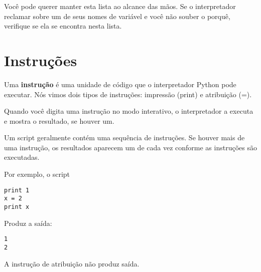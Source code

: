 Você pode querer manter esta lista ao alcance das mãos. Se o interpretador reclamar
sobre um de seus nomes de variável e você não souber o porquê, verifique se ela
se encontra nesta lista.

\section{Instruções}

Uma {\bf instrução} é uma unidade de código que o interpretador Python 
pode executar. Nós vimos dois tipos de instruções: impressão (print) 
e atribuição (=).


Quando você digita uma instrução no modo interativo, o interpretador 
a executa e mostra o resultado, se houver um.

Um script geralmente contém uma sequência de instruções. Se houver 
mais de uma instrução, os resultados aparecem um de cada vez 
conforme as instruções são executadas.

Por exemplo, o script

\beforeverb
\begin{verbatim}
print 1
x = 2
print x
\end{verbatim}
\afterverb
%

Produz a saída:

\beforeverb
\begin{verbatim}
1
2
\end{verbatim}
\afterverb
%

A instrução de atribuição não produz saída.

